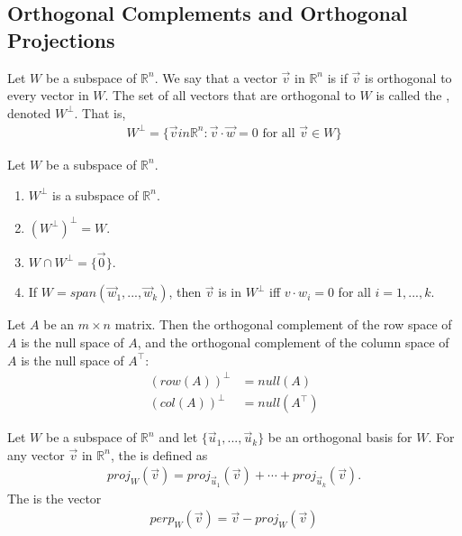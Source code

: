 \documentclass{article}
\begin{document}
\subsection{Orthogonal Complements and Orthogonal Projections}
\begin{definition}
    Let $W$ be a subspace of $\mathbb{R}^n$. We say that a vector $\vec v$ in $\mathbb{R}^n$ is  if $\vec v$ is orthogonal to every vector in $W$. The set of all vectors that are orthogonal to $W$ is called the , denoted $W^{\perp}$. That is,
    \begin{align*}
        W^{\perp} = \{\vec v in \mathbb{R}^n:\vec v \cdot \vec w = 0 \text{ for all }\vec v\in W\}
    \end{align*}
\end{definition}
\begin{theorem}
    Let $W$ be a subspace of $\mathbb{R}^n$.
    \begin{enumerate}
        \item $W^{\perp}$ is a subspace of $\mathbb{R}^n$.
        \item $\left(W^{\perp}\right)^{\perp}=W$.
        \item $W\cap W^{\perp}=\{\vec 0\}$.
        \item If $W=span({\vec w_1, ..., \vec w_k})$, then $\vec v$ is in $W^{\perp}$ iff $v\cdot w_i=0$ for all $i=1,...,k$.
    \end{enumerate}
\end{theorem}
\begin{theorem}
    Let $A$ be an $m\times n$ matrix. Then the orthogonal complement of the row space of $A$ is the null space of $A$, and the orthogonal complement of the column space of $A$ is the null space of $A^\intercal $:
    \begin{align*}
        (row(A))^{\perp}&=null(A)\\
        (col(A))^{\perp}&=null(A^\intercal )
    \end{align*}
\end{theorem}
\begin{definition}
    Let $W$ be a subspace of $\mathbb{R}^n$ and let $\{\vec u_1, ..., \vec u_k\}$ be an orthogonal basis for $W$.
    For any vector $\vec v$ in $\mathbb{R}^n$, the  is defined as
    \begin{align*}
        proj_W(\vec v)=proj_{\vec u_1}(\vec v) + \cdots + proj_{\vec u_k}(\vec v).
    \end{align*}
    The  is the vector
    \begin{align*}
        perp_W(\vec v) = \vec v - proj_W(\vec v)
    \end{align*}
\end{definition}
\end{document}
